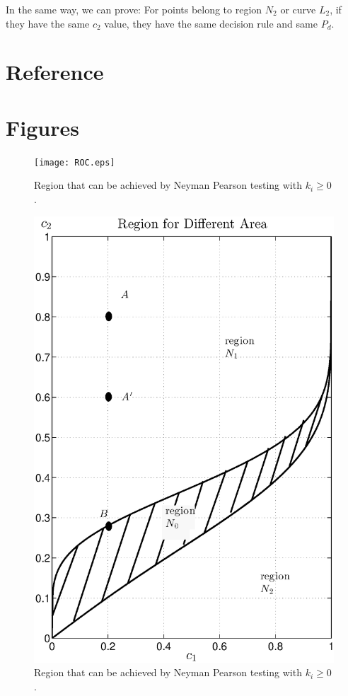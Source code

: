 \documentclass[12pt,journal,a4paper,twoside,onecolumn,draft]{IEEEtran}
\begin{document}
\begin{spacing}{2.5}
In the same way, we can prove: For points belong to region $N_2$ or curve $L_2$, if they have the same $c_2$ value, they have the same decision rule and same $P_d$.

\section{Reference}
\newpage

\section{Figures}
\newpage

\begin{figure}[!t]
\centering
\texttt{[image: ROC.eps]}
\caption{Region that can be achieved by Neyman Pearson testing with $k_i \geq 0$.}
\label{pic: surface for m0 gaussian}
\end{figure}
\newpage
\begin{figure}[!t]
\centering
\includegraphics[width=12cm]{region.eps}
\caption{Region that can be achieved by Neyman Pearson testing with $k_i \geq 0$.}
\label{pic: contour for m0 gaussian}
\end{figure}


\end{spacing}
\end{document}
